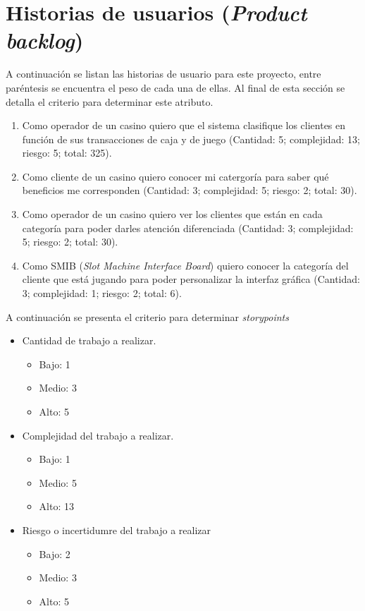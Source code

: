 \documentclass[11pt]{charter}
\begin{document}
\section{Historias de usuarios (\textit{Product backlog})}
\label{sec:backlog}
A continuación se listan las historias de usuario para este proyecto, entre paréntesis se encuentra el peso
de cada una de ellas. Al final de esta sección se detalla el criterio para determinar este atributo.

\begin{enumerate}
  \item Como operador de un casino quiero que el sistema clasifique los clientes en función de sus transacciones
  de caja y de juego (Cantidad: 5; complejidad: 13; riesgo: 5; total: 325).
  \item Como cliente de un casino quiero conocer mi catergoría para saber qué beneficios me corresponden (Cantidad: 3; 
  complejidad: 5; riesgo: 2; total: 30).
  \item Como operador de un casino quiero ver los clientes que están en cada categoría para poder darles 
  atención diferenciada (Cantidad: 3; complejidad: 5; riesgo: 2; total: 30).
  \item Como SMIB (\textit{Slot Machine Interface Board}) quiero conocer la categoría del cliente que está jugando 
  para poder personalizar la interfaz gráfica (Cantidad: 3; complejidad: 1; riesgo: 2; total: 6).
\end{enumerate}

A continuación se presenta el criterio para determinar \textit{storypoints}

\begin{itemize}
  \item Cantidad de trabajo a realizar.
  \begin{itemize}
    \item Bajo: 1
    \item Medio: 3
    \item Alto: 5
  \end{itemize}
  \item Complejidad del trabajo a realizar.
  \begin{itemize}
    \item Bajo: 1
    \item Medio: 5
    \item Alto: 13
  \end{itemize}
  \item Riesgo o incertidumre del trabajo a realizar
  \begin{itemize}
    \item Bajo: 2
    \item Medio: 3
    \item Alto: 5
  \end{itemize}
\end{itemize}
\end{document}
